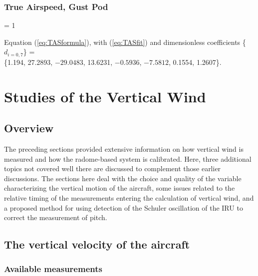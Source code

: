 \documentclass[12pt,twoside,english]{article}\usepackage[]{graphicx}\usepackage[]{color}
\makeatletter
\newlength{\lyxhang}
\newenvironment{hangparagraphs}
     {%
       \ifthenelse{\lengthtest{\parindent > 0pt}}%
         {\setlength{\lyxhang}{\parindent}}%
         {\setlength{\lyxhang}{2em}}%
       \par\begin{hangparas}{\lyxhang}{1}%
     }
     {\end{hangparas}}
\newenvironment{hangparagraphs}
     {%
       \ifthenelse{\lengthtest{\parindent > 0pt}}%
         {\setlength{\lyxhang}{\parindent}}%
         {\setlength{\lyxhang}{2em}}%
       \begin{hangparas}%
     }
     {\end{hangparas}}
\newcommand{\hangpara}{\hangindent \lyxhang \hangafter 1 \noindent}
\newenvironment{hangparas}{\setlength{\parindent}{\z@}
   \everypar={\hangpara}}{\par}
\let\stdsection\section
\renewcommand{\section}{\newpage\stdsection}
\let\OrgIndex\index
\renewcommand*{\index}[1]{\OrgIndex{#1}}
\makeatother
\begin{document}
\subsubsection{True Airspeed, Gust Pod}
\begin{hangparagraphs}
Equation (\ref{eq:TASformula}), with (\ref{eq:TASfit}) and dimensionless coefficients%
\{$d_{i=0,7}$\} = \\%
\qquad{} \{1.194, 27.2893, \ensuremath{-29.0483}, 13.6231, \ensuremath{-0.5936}, \ensuremath{-7.5812}, 0.1554, 1.2607\}.%
\end{hangparagraphs}




\section{Studies of the Vertical Wind\label{sec:vertical-wind}}

\subsection{Overview}

The preceding sections provided extensive information on how vertical wind is measured and how the radome-based system is calibrated. Here, three additional topics not covered well there are discussed to complement those earlier discussions. The sections here deal with the choice and quality of the variable characterizing the vertical motion of the aircraft, some issues related to the relative timing of the measurements entering the calculation of vertical wind, and a proposed method for using detection of the Schuler oscillation of the IRU to correct the measurement of pitch. 


\subsection{The vertical velocity of the aircraft\label{sec:VerticalVelocity}}


\subsubsection{Available measurements}
\end{document}
